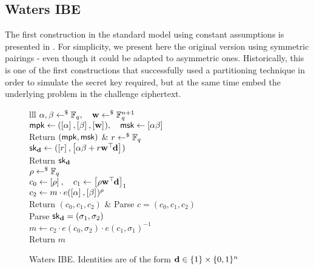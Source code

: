 
\subsection{Waters IBE}

The first construction in the standard model using constant assumptions is presented in \cite{EC:Waters05}. 
For simplicity, we present here the original version using symmetric pairings - even though it could be adapted to asymmetric ones.
Historically, this is one of the first constructions that successfully used a partitioning technique in order to simulate the secret key required, but at the same time embed the underlying problem in the challenge ciphertext.

\begin{figure}[htb]
\centering
\begin{pcarray}{lll}
		{
			$\alpha, \beta \rgets \F_q, \quad \vc{w} \rgets \F_q^{n+1}$
				\\
			$\mpk \gets (\gexp{}{\alpha}, \gexp{}{\beta}, \gexp{}{\vc{w}}),
				\quad
			\msk \gets \gexp{}{\alpha \beta}$
				\\
			Return $(\mpk, \msk)$
		}
	&
		{
			$r \rgets \F_q$
				\\
			$\sk_\vc{d} \gets (\gexp{}{r}, \gexp{}{\alpha \beta + r \vc{w}^\trs \vc{d}})$
				\\
			Return $\sk_\vc{d}$
		}
	\\
			{
				$\rho \rgets \F_q$
					\\
				$c_0 \gets \gexp{}{\rho}
					, \quad 
				c_1 \gets \gexp{1}{\rho \vc{w}^\trs \vc{d}}$
					\\
				$c_2 \gets m \cdot e(\gexp{}{\alpha}, \gexp{}{\beta})^\rho$
					\\
				Return $(c_0, c_1, c_2)$
			}
	&
		{
			Parse $c = (c_0, c_1, c_2)$
				\\
			Parse $\sk_\vc{d} = (\sigma_1, \sigma_2)$
				\\
			$m \gets c_2 \cdot e(c_0, \sigma_2) \cdot e(c_1, \sigma_1)^{-1}$
				\\
			Return $m$
		}
\end{pcarray}
\caption{Waters IBE. Identities are of the form $\vc{d} \in \{1\} \times \{0, 1\}^n$}
\label{prot:Waters05:IBE}
\end{figure}

